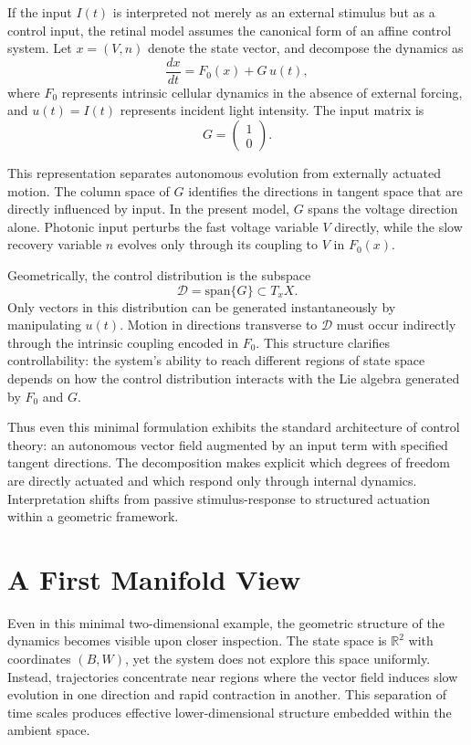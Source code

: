 \documentclass[12pt]{book}
\begin{document}
If the input $I(t)$ is interpreted not merely as an external stimulus
but as a control input, the retinal model assumes the canonical form
of an affine control system. Let $x = (V,n)$ denote the state vector,
and decompose the dynamics as
\[
\frac{dx}{dt}
=
F_0(x)
+
G\,u(t),
\]
where $F_0$ represents intrinsic cellular dynamics in the absence of
external forcing, and $u(t)=I(t)$ represents incident light intensity.
The input matrix is
\[
G =
\begin{pmatrix}
1 \\[4pt]
0
\end{pmatrix}.
\]

This representation separates autonomous evolution from externally
actuated motion. The column space of $G$ identifies the directions in
tangent space that are directly influenced by input. In the present
model, $G$ spans the voltage direction alone. Photonic input perturbs
the fast voltage variable $V$ directly, while the slow recovery
variable $n$ evolves only through its coupling to $V$ in $F_0(x)$.

Geometrically, the control distribution is the subspace
\[
\mathcal{D} = \mathrm{span}\{G\} \subset T_x X.
\]
Only vectors in this distribution can be generated instantaneously
by manipulating $u(t)$. Motion in directions transverse to
$\mathcal{D}$ must occur indirectly through the intrinsic coupling
encoded in $F_0$. This structure clarifies controllability: the system's
ability to reach different regions of state space depends on how the
control distribution interacts with the Lie algebra generated by
$F_0$ and $G$.

Thus even this minimal formulation exhibits the standard architecture
of control theory: an autonomous vector field augmented by an input
term with specified tangent directions. The decomposition makes
explicit which degrees of freedom are directly actuated and which
respond only through internal dynamics. Interpretation shifts from
passive stimulus-response to structured actuation within a geometric
framework.

\section{A First Manifold View}

Even in this minimal two-dimensional example, the geometric structure
of the dynamics becomes visible upon closer inspection. The state
space is $\mathbb{R}^2$ with coordinates $(B,W)$, yet the system does
not explore this space uniformly. Instead, trajectories concentrate
near regions where the vector field induces slow evolution in one
direction and rapid contraction in another. This separation of time
scales produces effective lower-dimensional structure embedded within
the ambient space.
\end{document}
